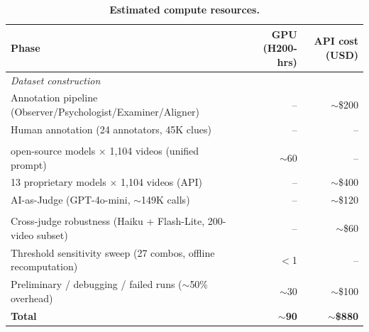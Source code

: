 \documentclass{article}
\begin{document}
\begin{table}[t]
\caption{\textbf{Estimated compute resources.}}
\label{tab:compute}
\centering
\small
\setlength{\tabcolsep}{6pt}
\renewcommand{\arraystretch}{1.15}
\begin{tabular}{lrr}
\toprule
\textbf{Phase} & \textbf{GPU (H200-hrs)} & \textbf{API cost (USD)} \\
\midrule
\multicolumn{3}{l}{\textit{Dataset construction}} \\
\addlinespace[2pt]
Annotation pipeline (Observer/Psychologist/Examiner/Aligner) & -- & $\sim$\$200 \\
Human annotation (24 annotators, 45K clues) & -- & -- \\
\addlinespace[4pt]
\multicolumn{3}{l}{\textit{Main benchmark evaluation}} \\
\addlinespace[2pt]
14 open-source models $\times$ 1,104 videos (unified prompt) & $\sim$60 & -- \\
13 proprietary models $\times$ 1,104 videos (API) & -- & $\sim$\$400 \\
AI-as-Judge (GPT-4o-mini, $\sim$149K calls) & -- & $\sim$\$120 \\
\addlinespace[4pt]
\multicolumn{3}{l}{\textit{Robustness and auxiliary experiments}} \\
\addlinespace[2pt]
Cross-judge robustness (Haiku + Flash-Lite, 200-video subset) & -- & $\sim$\$60 \\
Threshold sensitivity sweep (27 combos, offline recomputation) & $<$1 & -- \\
Preliminary / debugging / failed runs ($\sim$50\% overhead) & $\sim$30 & $\sim$\$100 \\
\midrule
\textbf{Total} & $\sim$\textbf{90} & $\sim$\textbf{\$880} \\
\bottomrule
\end{tabular}
\end{table}
\end{document}
